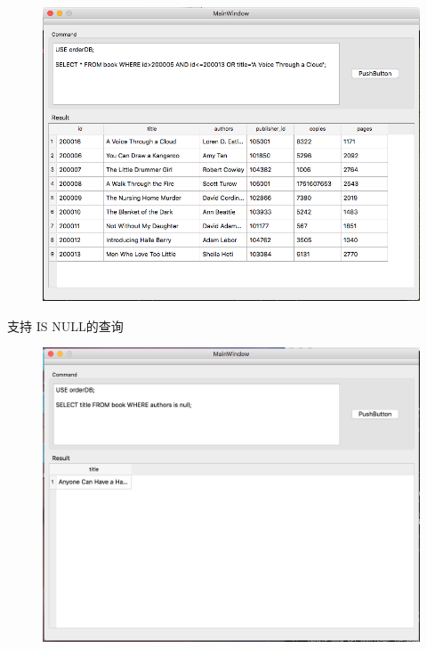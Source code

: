 \begin{figure}[H]
\centering
\includegraphics[width=5in]{Figures/screen_shot/where.png}
\end{figure}
支持 IS NULL的查询
\begin{figure}[H]
\centering
\includegraphics[width=5in]{Figures/screen_shot/isnull.png}
\end{figure}

